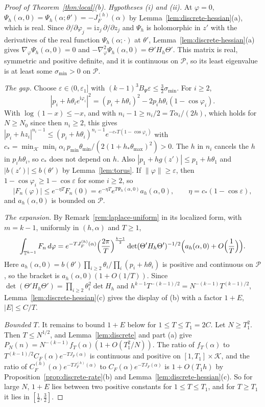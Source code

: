 \begin{proof}[Proof of Theorem~\ref{thm:local}(b)]
\emph{Hypotheses \textup{(i)} and \textup{(ii)}.} At $\varphi=0$,
$\Psi_h(\alpha,0)=\Psi_h(\alpha;\theta')=-J^{(h)}_F(\alpha)$ by
Lemma~\ref{lem:discrete-hessian}(a), which is real. Since
$\partial/\partial\varphi_j=\mathrm iz_j\,\partial/\partial z_j$ and $\Psi_h$ is
holomorphic in $z'$ with the derivatives of the real function $\Psi_h(\alpha;\cdot)$ at
$\theta'$, Lemma~\ref{lem:discrete-hessian}(a) gives $\nabla_\varphi\Psi_h(\alpha,0)=0$
and $-\nabla^2_\varphi\Psi_h(\alpha,0)=\Theta'H_h\Theta'$. This matrix is real,
symmetric and positive definite, and it is continuous on $\mathcal P$, so its least
eigenvalue is at least some $\sigma_{\min}>0$ on $\mathcal P$.

\emph{The gap.} Choose $\varepsilon\in(0,\varepsilon_1]$ with
$(k-1)^3B_\Psi\varepsilon\le\frac32\sigma_{\min}$. For $i\ge2$,
\[
|p_i+h\theta_ie^{\mathrm i\varphi_i}|^2=(p_i+h\theta_i)^2-2p_ih\theta_i(1-\cos\varphi_i).
\]
With $\log(1-x)\le-x$, and with $n_i-1\ge n_i/2=T\alpha_i/(2h)$, which holds for
$N\ge N_0$ since then $n_i\ge2$, this gives
$|p_i+hz_i|^{n_i-1}\le(p_i+h\theta_i)^{n_i-1}e^{-c_*T(1-\cos\varphi_i)}$ with
$c_*=\min_{\mathcal K}\min_i\alpha_i\,p_{\min}\theta_{\min}/(2(1+h_*\theta_{\max})^2)>0$.
The $h$ in $n_i$ cancels the $h$ in $p_ih\theta_i$, so $c_*$ does not depend on $h$.
Also $|p_1+hg(z')|\le p_1+h\theta_1$ and $|b(z')|\le b(\theta')$ by
Lemma~\ref{lem:torus}. If $\lVert\varphi\rVert\ge\varepsilon$, then
$1-\cos\varphi_i\ge1-\cos\varepsilon$ for some $i\ge2$, so
\[
|F_n(\varphi)|\le e^{-\eta T}F_n(0)=e^{-\eta T}e^{T\Psi_h(\alpha,0)}a_h(\alpha,0),
\qquad\eta=c_*(1-\cos\varepsilon),
\]
and $a_h(\alpha,0)$ is bounded on $\mathcal P$.

\emph{The expansion.} By Remark~\ref{rem:laplace-uniform} in its localized form, with
$m=k-1$, uniformly in $(h,\alpha)$ and $T\ge1$,
\[
\int_{\mathbb T^{k-1}}F_n\,d\varphi=e^{-TJ^{(h)}_F(\alpha)}\Bigl(\frac{2\pi}T\Bigr)^{\frac{k-1}2}
\det(\Theta'H_h\Theta')^{-1/2}\Bigl(a_h(\alpha,0)+O\Bigl(\frac1T\Bigr)\Bigr).
\]
Here $a_h(\alpha,0)=b(\theta')\prod_{i\ge2}\theta_i/\prod_i(p_i+h\theta_i)$ is positive
and continuous on $\mathcal P$, so the bracket is $a_h(\alpha,0)(1+O(1/T))$. Since
$\det(\Theta'H_h\Theta')=\prod_{i\ge2}\theta_i^2\det H_h$ and
$h^{k-1}T^{-(k-1)/2}=N^{-(k-1)}T^{(k-1)/2}$, Lemma~\ref{lem:discrete-hessian}(c) gives
the display of (b) with a factor $1+E$, $|E|\le C/T$.

\emph{Bounded $T$.} It remains to bound $1+E$ below for $1\le T\le T_1=2C$. Let
$N\ge T_1^2$. Then $T\le N^{1/2}$, and Lemma~\ref{lem:discrete} and part (a) give
$P_N(n)=N^{-(k-1)}f_T(\alpha)(1+O(T_1^2/N))$. The ratio of $f_T(\alpha)$ to
$T^{(k-1)/2}C_F(\alpha)e^{-TJ_F(\alpha)}$ is continuous and positive on
$[1,T_1]\times\mathcal K$, and the ratio of
$C^{(h)}_F(\alpha)e^{-TJ^{(h)}_F(\alpha)}$ to $C_F(\alpha)e^{-TJ_F(\alpha)}$ is
$1+O(T_1h)$ by Proposition~\ref{prop:discrete-rate}(b) and
Lemma~\ref{lem:discrete-hessian}(c). So for large $N$, $1+E$ lies between two positive
constants for $1\le T\le T_1$, and for $T\ge T_1$ it lies in $[\frac12,\frac32]$.
\end{proof}
